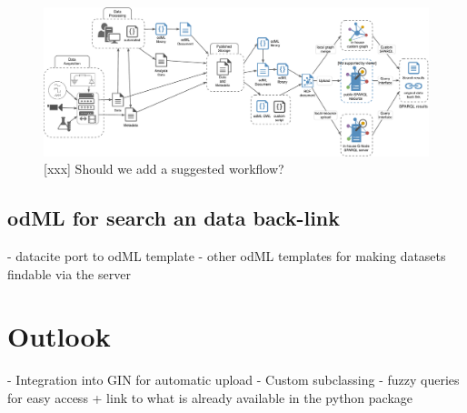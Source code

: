 \documentclass{article}
\begin{document}
\begin{figure}
\begin{center}
\includegraphics[width=0.90\columnwidth]{figures/workflowSchema.pdf}
\caption{[xxx] Should we add a suggested workflow?}
\label{fig:workflowSchema}
\end{center}
\end{figure}

\subsection{odML for search an data back-link} \label{sec:data_back_link}
- datacite port to odML template
- other odML templates for making datasets findable via the server

\section{Outlook} \label{sec:outlook}
- Integration into GIN for automatic upload
- Custom subclassing
- fuzzy queries for easy access + link to what is already available in the python package
\end{document}
